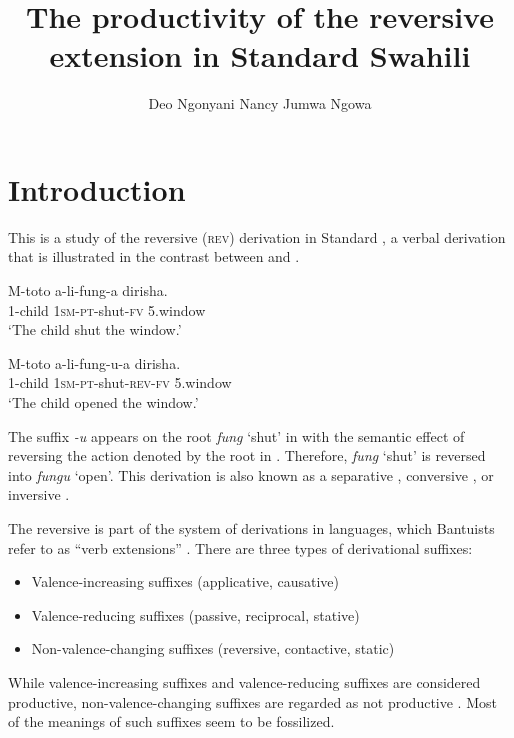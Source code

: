 \documentclass[output=paper]{langsci/langscibook}
\title{The productivity of the reversive extension in Standard Swahili}
\author{%
 Deo Ngonyani\affiliation{Michigan State University}\lastand 
 Nancy Jumwa Ngowa \affiliation{Pwani University}
}
\begin{document}

\section{Introduction}\label{sec:ngonyaningowa:1}

This is a study of the reversive (\textsc{rev}) derivation in Standard , a verbal derivation that is illustrated in the contrast between  and .

\ea\label{ex:ngonyaningowa:1}
\ea\label{ex:ngonyaningowa:1a}  
\gll M-toto    a-li-fung-a    dirisha. \\
1-child    1\textsc{sm-pt}-shut-\textsc{fv}  5.window \\
\glt ‘The child shut the window.’

\ex\label{ex:ngonyaningowa:1b}
\gll M-toto    a-li-fung-u-a      dirisha. \\
1-child    1\textsc{sm-pt}-shut-\textsc{rev-fv}  5.window \\
\glt ‘The child opened the window.’
\z
\z

The suffix \textit{-u} appears on the root \textit{fung} ‘shut’ in  with the semantic effect of reversing the action denoted by the root  in . Therefore, \textit{fung} ‘shut’ is reversed into \textit{fungu} ‘open’. This derivation is also known as a separative \citep{Schadeberg2003}, conversive \citep{Ashton1947}, or inversive \citep{Doke1935}.

The reversive is part of the system of derivations in  languages, which  Bantuists refer to as “verb extensions” \citep{Guthrie1962}. There are three types of derivational suffixes:

\begin{itemize}[noitemsep]
\item Valence-increasing suffixes (applicative, causative)
\item Valence-reducing suffixes (passive, reciprocal, stative)
\item Non-valence-changing suffixes (reversive, contactive, static)
\end{itemize}

While valence-increasing suffixes and valence-reducing suffixes are considered productive, non-valence-changing suffixes are regarded as not productive \citep{Shepardson1986}. Most of the meanings of such suffixes seem to be fossilized.
\end{document}
